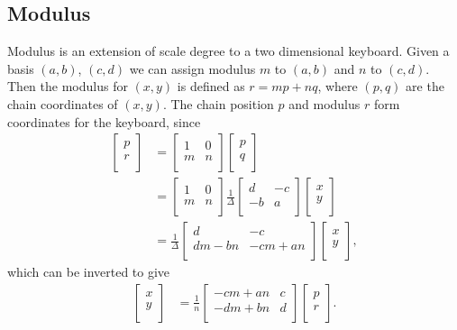 \documentclass[a4paper,11pt]{article}
\begin{document}
\subsection{Modulus}
\label{subsec:modulus}
Modulus is an extension of scale degree to a two dimensional keyboard. Given a
basis $(a, b)$, $(c, d)$ we can assign modulus $m$ to $(a, b)$ and $n$ to $(c,
d)$. Then the modulus for $(x, y)$ is defined as $r = mp + nq$, where $(p, q)$
are the chain coordinates of $(x, y)$. The chain position $p$ and modulus $r$
form coordinates for the keyboard, since
\begin{align}
\begin{bmatrix}
    p \\
    r \\
\end{bmatrix}
    &=
\begin{bmatrix}
    1 & 0 \\
    m & n \\
\end{bmatrix}
\begin{bmatrix}
    p \\
    q \\
\end{bmatrix} \\
    &=
\begin{bmatrix}
    1 & 0 \\
    m & n \\
\end{bmatrix}
\frac{1}{\Delta}
\begin{bmatrix}
    d & -c \\
    -b & a \\
\end{bmatrix}
\begin{bmatrix}
    x \\
    y \\
\end{bmatrix} \\
    &=
\frac{1}{\Delta}
\begin{bmatrix}
    d & -c \\
    dm - bn & -cm + an \\
\end{bmatrix}
\begin{bmatrix}
    x \\
    y \\
\end{bmatrix},
\end{align}
which can be inverted to give
\begin{align}
\begin{bmatrix}
    x \\
    y \\
\end{bmatrix}
    &=
\frac{1}{n}
\begin{bmatrix}
    -cm + an & c \\
    -dm + bn & d \\
\end{bmatrix}
\begin{bmatrix}
    p \\
    r \\
\end{bmatrix}.
\end{align}
\end{document}
